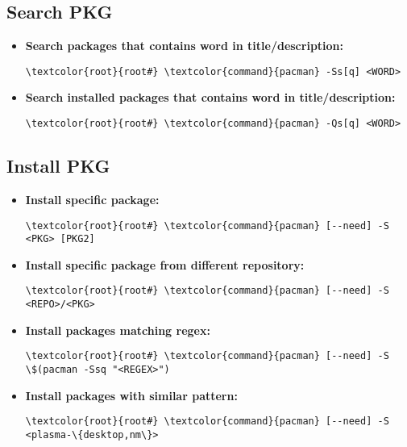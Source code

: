 \documentclass[10pt, a4paper, onecolumn, openany]{book} %
\begin{document}
\subsection{Search PKG}
\begin{itemize}
    \item \textbf{Search packages that contains word in title/description:}
\begin{Verbatim}[commandchars=\\\{\}]
\textcolor{root}{root#} \textcolor{command}{pacman} -Ss[q] <WORD>
\end{Verbatim}
    \item \textbf{Search installed packages that contains word in title/description:}
\begin{Verbatim}[commandchars=\\\{\}]
\textcolor{root}{root#} \textcolor{command}{pacman} -Qs[q] <WORD>
\end{Verbatim} 
\end{itemize}
\subsection{Install PKG}
\begin{itemize}
    \item \textbf{Install specific package:}
\begin{Verbatim}[commandchars=\\\{\}]
\textcolor{root}{root#} \textcolor{command}{pacman} [--need] -S <PKG> [PKG2]
\end{Verbatim}
    \item \textbf{Install specific package from different repository:}
\begin{Verbatim}[commandchars=\\\{\}]
\textcolor{root}{root#} \textcolor{command}{pacman} [--need] -S <REPO>/<PKG>
\end{Verbatim}
    \item \textbf{Install packages matching regex:}
\begin{Verbatim}[commandchars=\\\{\}]
\textcolor{root}{root#} \textcolor{command}{pacman} [--need] -S \$(pacman -Ssq "<REGEX>")
\end{Verbatim}
    \item \textbf{Install packages with similar pattern:}
\begin{Verbatim}[commandchars=\\\{\}]
\textcolor{root}{root#} \textcolor{command}{pacman} [--need] -S <plasma-\{desktop,nm\}>
\end{Verbatim}    
\end{itemize}
\end{document}
